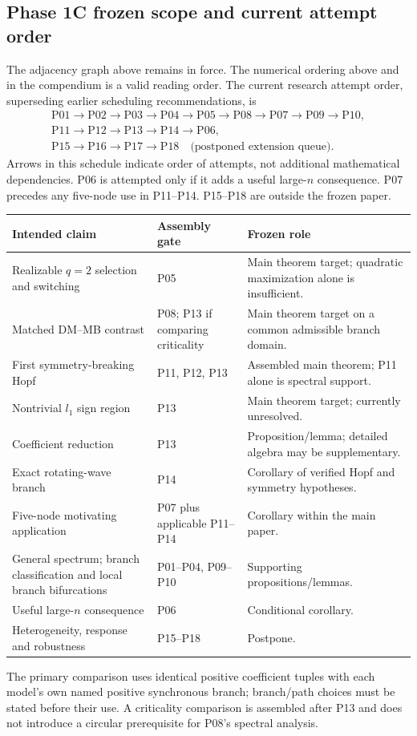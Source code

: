 \subsection{Phase 1C frozen scope and current attempt order}
The adjacency graph above remains in force. The numerical ordering above and
in the compendium is a valid reading order. The current research attempt order,
superseding earlier scheduling recommendations, is
\[
\begin{gathered}
\mathrm{P01}\to\mathrm{P02}\to\mathrm{P03}\to\mathrm{P04}\to\mathrm{P05}
\to\mathrm{P08}\to\mathrm{P07}\to\mathrm{P09}\to\mathrm{P10},\\
\mathrm{P11}\to\mathrm{P12}\to\mathrm{P13}\to\mathrm{P14}\to\mathrm{P06},\\
\mathrm{P15}\to\mathrm{P16}\to\mathrm{P17}\to\mathrm{P18}
\quad\text{(postponed extension queue).}
\end{gathered}
\]
Arrows in this schedule indicate order of attempts, not additional mathematical
dependencies. P06 is attempted only if it adds a useful large-$n$ consequence.
P07 precedes any five-node use in P11--P14. P15--P18 are outside the frozen paper.

\begin{longtable}{p{}p{}p{}}
\toprule Intended claim & Assembly gate & Frozen role \\
\midrule\endhead
Realizable $q=2$ selection and switching & P05 & Main theorem target; quadratic maximization alone is insufficient. \\
Matched DM--MB contrast & P08; P13 if comparing criticality & Main theorem target on a common admissible branch domain. \\
First symmetry-breaking Hopf & P11, P12, P13 & Assembled main theorem; P11 alone is spectral support. \\
Nontrivial $l_1$ sign region & P13 & Main theorem target; currently unresolved. \\
Coefficient reduction & P13 & Proposition/lemma; detailed algebra may be supplementary. \\
Exact rotating-wave branch & P14 & Corollary of verified Hopf and symmetry hypotheses. \\
Five-node motivating application & P07 plus applicable P11--P14 & Corollary within the main paper. \\
General spectrum; branch classification and local branch bifurcations & P01--P04, P09--P10 & Supporting propositions/lemmas. \\
Useful large-$n$ consequence & P06 & Conditional corollary. \\
Heterogeneity, response and robustness & P15--P18 & Postpone. \\
\bottomrule\end{longtable}
The primary comparison uses identical positive coefficient tuples with each
model's own named positive synchronous branch; branch/path choices must be
stated before their use. A criticality comparison is assembled after P13 and
does not introduce a circular prerequisite for P08's spectral analysis.


